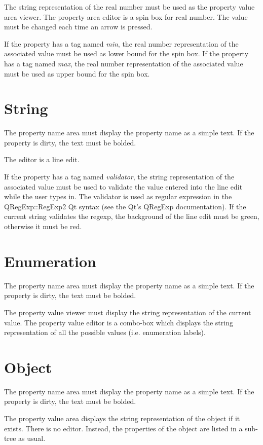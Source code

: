 \documentclass[a4paper, twoside]{report}
\begin{document}
The string representation of the real number must be used as the property value area viewer.
The property area editor is a spin box for real number. The value must be changed each time an arrow
is pressed.

If the property has a tag named \emph{min}, the real number representation of the associated value must be used as lower bound for the spin box.
If the property has a tag named \emph{max}, the real number representation of the associated value must be used as upper bound for the spin box.

\section{String}

The property name area must display the property name as a simple text. If the property is dirty,
the text must be bolded.

The editor is a line edit.

If the property has a tag named \emph{validator}, the string representation of the associated value
must be used to validate the value entered into the line edit while the user types in. The validator
is used as regular expression in the QRegExp::RegExp2 Qt syntax (see the Qt's QRegExp
documentation). If the current string validates the regexp, the background of the line edit must be
green, otherwise it must be red.

\section{Enumeration}

The property name area must display the property name as a simple text. If the property is dirty,
the text must be bolded.

The property value viewer must display the string representation of the current value.
The property value editor is a combo-box which displays the string representation of all the
possible values (i.e. enumeration labels).

\section{Object}

The property name area must display the property name as a simple text. If the property is dirty,
the text must be bolded.

The property value area displays the string representation of the object if it exists.
There is no editor. Instead, the properties of the object are listed in a sub-tree as usual.
\end{document}
